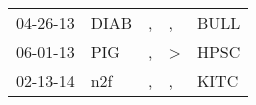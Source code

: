 \begin{supertabular}{p{0.07\textwidth}p{0.06\textwidth}p{0.02\textwidth}p{0.02\textwidth}p{0.06\textwidth}}
 04-26-13\textsuperscript{} &  DIAB\textsuperscript{} &  , &             , &  BULL\textsuperscript{} \\
 06-01-13\textsuperscript{} &   PIG\textsuperscript{} &  , &  \textgreater &  HPSC\textsuperscript{} \\
 02-13-14\textsuperscript{} &   n2f\textsuperscript{} &  , &             , &  KITC\textsuperscript{} \\
\end{supertabular}
